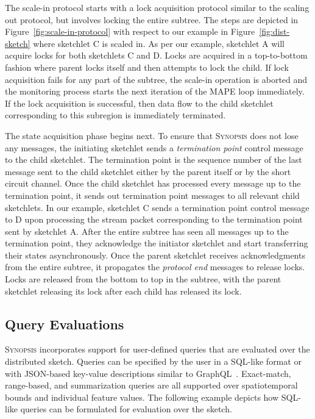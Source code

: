 \documentclass[9pt,journal,compsoc]{IEEEtran}
\begin{document}
The scale-in protocol starts with a lock acquisition protocol similar to the scaling out protocol, but involves locking the entire subtree.
The steps are depicted in Figure~\ref{fig:scale-in-protocol} with respect to our example in Figure~\ref{fig:dist-sketch} where sketchlet C is scaled in.
As per our example, sketchlet A will acquire locks for both sketchlets C and D.
Locks are acquired in a top-to-bottom fashion where parent locks itself and then attempts to lock the child.
If lock acquisition fails for any part of the subtree, the scale-in operation is aborted and the monitoring process starts the next iteration of the MAPE loop immediately.
If the lock acquisition is successful, then data flow to the child sketchlet corresponding to this subregion is immediately terminated.

The state acquisition phase begins next.
To ensure that \textsc{Synopsis} does not lose any messages, the initiating sketchlet sends a \emph{termination point} control message to the child sketchlet.
The termination point is the sequence number of the last message sent to the child sketchlet either by the parent itself or by the short circuit channel.
Once the child sketchlet has processed every message up to the termination point, it sends out termination point messages to all relevant child sketchlets. In our example, sketchlet C sends a termination point control message to D upon processing the stream packet corresponding to the termination point sent by sketchlet A.
After the entire subtree has seen all messages up to the termination point, they acknowledge the initiator sketchlet and start transferring their states asynchronously.
Once the parent sketchlet receives acknowledgments from the entire subtree, it propagates the \emph{protocol end} messages to release locks.
Locks are released from the bottom to top in the subtree, with the parent sketchlet releasing its lock after each child has released its lock.
%
\subsection{Query Evaluations}
\label{subsec:query-eval}
\textsc{Synopsis} incorporates support for user-defined queries that are evaluated over the distributed sketch.  Queries can be specified by the user in a SQL-like format or with JSON-based key-value descriptions similar to GraphQL~\cite{graphql}. Exact-match, range-based, and summarization queries are all supported over spatiotemporal bounds and individual feature values. The following example depicts how SQL-like queries can be formulated for evaluation over the sketch.
\end{document}
